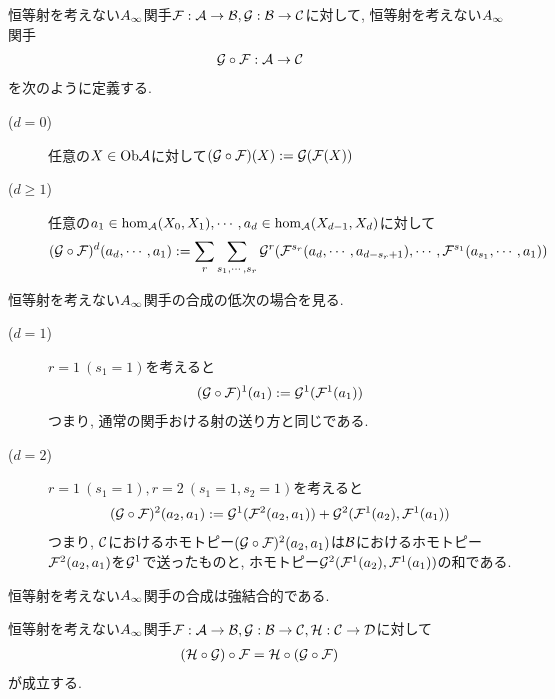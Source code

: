 \documentclass[uplatex, a4paper, 14Q, dvipdfmx]{jsarticle}
\begin{document}
\begin{definition} \label{def_comp_of_Ainf_func}
  恒等射を考えない$A_{\infty}$関手$\mathcal{F} : \mathcal{A} \to \mathcal{B}, \mathcal{G} : \mathcal{B} \to \mathcal{C}$に対して, 恒等射を考えない$A_{\infty}$関手
  \begin{align*}
    \mathcal{G} \circ \mathcal{F} : \mathcal{A} \to \mathcal{C}
  \end{align*}
  を次のように定義する. 
  \begin{description}
    \item[($d=0$)] 任意の$X \in \mathrm{Ob}\mathcal{A}$に対して$(\mathcal{G} \circ \mathcal{F})(X) : = \mathcal{G}(\mathcal{F}(X))$
    \item[($d \geq 1$)] 任意の$a_1 \in \hom_{\mathcal{A}}(X_0,X_1), \cdots, a_d \in \hom_{\mathcal{A}}(X_{d-1},X_d)$に対して
    \begin{align*}
      (\mathcal{G} \circ \mathcal{F})^d (a_d,\cdots,a_1)
      := \sum_r \sum_{s_1,\cdots,s_r} \mathcal{G}^r(\mathcal{F}^{s_r} (a_d,\cdots,a_{d-s_r+1}), \cdots, \mathcal{F}^{s_1}(a_{s_1},\cdots,a_1))
    \end{align*}
  \end{description}
\end{definition}

\begin{remark}
  恒等射を考えない$A_{\infty}$関手の合成の低次の場合を見る. 
  \begin{description}
    \item[($d=1$)] $r=1 ~ (s_1=1)$を考えると
    \begin{align*}
      (\mathcal{G} \circ \mathcal{F})^1(a_1) 
      := \mathcal{G}^1(\mathcal{F}^1(a_1))
    \end{align*}
    つまり, 通常の関手おける射の送り方と同じである. 
    \item[($d=2$)] $r=1 ~ (s_1=1), r=2 ~ (s_1=1,s_2=1)$を考えると
    \begin{align*}
      (\mathcal{G} \circ \mathcal{F})^2(a_2,a_1) 
      := \mathcal{G}^1(\mathcal{F}^2(a_2,a_1)) + \mathcal{G}^2(\mathcal{F}^1(a_2),\mathcal{F}^1(a_1))
    \end{align*}
    つまり, $\mathcal{C}$におけるホモトピー$(\mathcal{G} \circ \mathcal{F})^2(a_2,a_1)$は$\mathcal{B}$におけるホモトピー$\mathcal{F}^2(a_2,a_1)$を$\mathcal{G}^1$で送ったものと, ホモトピー$\mathcal{G}^2(\mathcal{F}^1(a_2),\mathcal{F}^1(a_1))$の和である. 
  \end{description}
\end{remark}

恒等射を考えない$A_{\infty}$関手の合成は強結合的である. 

\begin{lemma} \label{prop_Ainf_functor_is_strictly_associative}
  恒等射を考えない$A_{\infty}$関手$\mathcal{F} : \mathcal{A} \to \mathcal{B}, \mathcal{G} : \mathcal{B} \to \mathcal{C}, \mathcal{H} : \mathcal{C} \to \mathcal{D}$に対して
  \begin{align*}
    (\mathcal{H} \circ \mathcal{G}) \circ \mathcal{F} = \mathcal{H} \circ (\mathcal{G} \circ \mathcal{F})
  \end{align*}
  が成立する. 
\end{lemma}
\end{document}
